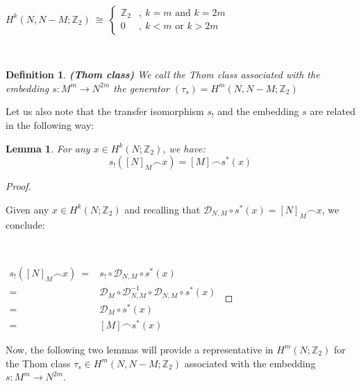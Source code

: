 \documentclass[12pt,oneside]{book}
\newtheorem{defi}   {Definition}[chapter]
\newtheorem{lem}    {Lemma}[chapter]
\newcommand{\Z}{\mathbb{Z}}
\newcommand{\ccap}{\frown}
\begin{document}
    \

    $H^{k}(N,N-M;\Z_{2}) \ \cong \ \left\{\begin{array}{cl}
    	\Z_{2} & , \ k=m \text{ and } k=2m \\
    	0      & , \ k<m \text{ or } k>2m
    \end{array}\right.$

    \

    \begin{defi}{\bf (Thom class)}
    	We call the Thom class associated with the embedding $s:M^{m}\to N^{2m}$ the generator $(\tau_{s})=H^{m}(N,N-M;\Z_{2})$
    \end{defi}

    Let us also note that the transfer isomorphism $s_{!}$ and the embedding $s$ are related in the following way:

    \begin{lem}\label{lema_tecnico_dualidades_4}
    	For any $x\in H^{k}(N;\Z_{2})$, we have:
    	$$ s_{!}([N]_{M}\ccap x)=[M]\ccap s^{*}(x) $$
    \end{lem}
    \begin{proof}

        \

    	Given any $x\in H^{k}(N;\Z_{2})$ and recalling that $\mathcal{D}_{N,M}\circ s^{*}(x)=[N]_{M}\ccap x$, we conclude:

        \
    
    	$ \begin{array}{rl}
    		s_{!}([N]_{M}\ccap x) \ = & s_{!}\circ \mathcal{D}_{N,M}\circ s^{*}(x) \\
    		= & \mathcal{D}_{M}\circ \mathcal{D}_{N,M}^{-1}\circ \mathcal{D}_{N,M}\circ s^{*}(x) \\
    		= & \mathcal{D}_{M}\circ s^{*}(x) \\
    		= & [M]\ccap s^{*}(x)
    	\end{array} $
    
    \end{proof}

    Now, the following two lemmas will provide a representative in $H^{m}(N;\Z_{2})$ for the Thom class 
    $\tau_{s}\in H^{m}(N,N-M;\Z_{2})$ associated with the embedding $s:M^{m}\to N^{2m}$.
\end{document}
